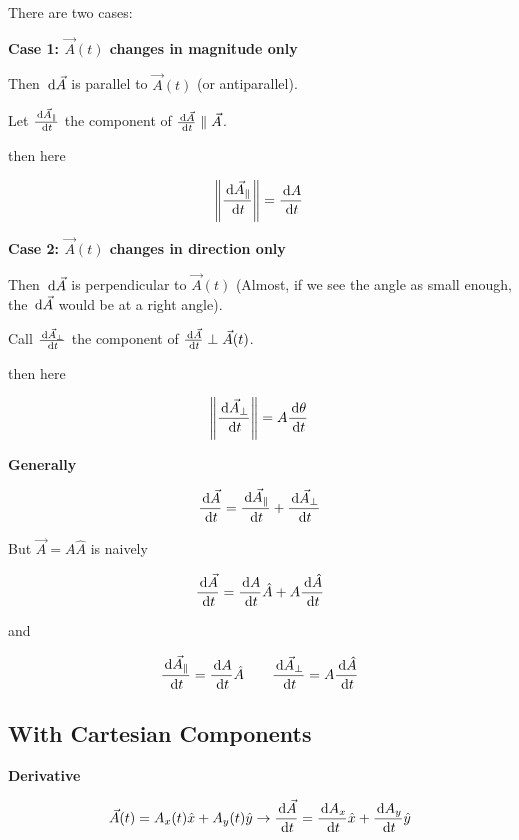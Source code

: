 There are two cases:

\textbf{Case 1: $\vec A(t)$ changes in magnitude only}

Then $\D \vec A$ is parallel to $\vec A(t)$ (or antiparallel).

Let $\frac{\D \vec A_\parallel}{\D t}$ the component of $\frac{\D \vec A}{\D t} \parallel \vec A$.

then here

\begin{equation}
	\norm{\frac{\D \vec A_\parallel}{\D t}} = \frac{\D A}{\D t}
\end{equation}

\textbf{Case 2: $\vec A(t)$ changes in direction only}

Then $\D \vec A$ is perpendicular to $\vec A(t)$ (Almost, if we see the angle as small enough, the $\D \vec A$ would be at a right angle).

Call $\frac{\D \vec A_\perp}{\D t}$ the component of $\frac{\D \vec A}{\D t} \perp \vec A(t)$.

then here

\begin{equation}
	\norm{\frac{\D \vec A_\perp}{\D t}} = A \frac{\D \theta}{\D t}
\end{equation}

\textbf{Generally}

\begin{equation}
	\frac{\D \vec A}{\D t} = \frac{\D \vec A_\parallel}{\D t} + \frac{\D \vec A_\perp}{\D t}
\end{equation}

But $\vec A = A \hat A$ is naively

\begin{equation}
	\frac{\D \vec A}{\D t} = \frac{\D A}{\D t} \hat A + A \frac{\D \hat A}{\D t}
\end{equation}

and

\begin{equation}
	\frac{\D \vec A_\parallel}{\D t} = \frac{\D A}{\D t} \hat A \qquad \frac{\D \vec A_\perp}{\D t} = A \frac{\D \hat A}{\D t}
\end{equation}

\subsection{With Cartesian Components}

\textbf{Derivative}

\begin{equation}
	\vec A(t) = A_x(t) \hat x + A_y(t) \hat y \to \frac{\D \vec A}{\D t} = \frac{\D A_x}{\D t} \hat x + \frac{\D A_y}{\D t} \hat y
\end{equation}

